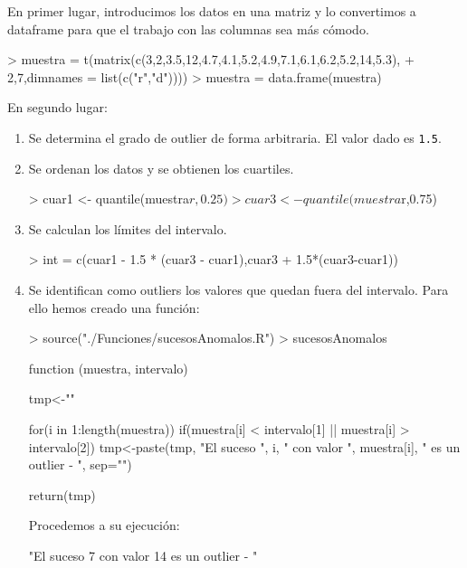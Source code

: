 \documentclass [a4paper] {article}
\begin{document}
\bigskip
En primer lugar, introducimos los datos en una matriz y lo convertimos a dataframe para que el trabajo con las 
columnas sea más cómodo.
\begin{Schunk}
\begin{Sinput}
> muestra = t(matrix(c(3,2,3.5,12,4.7,4.1,5.2,4.9,7.1,6.1,6.2,5.2,14,5.3),
+         2,7,dimnames = list(c("r","d"))))
> muestra = data.frame(muestra)
\end{Sinput}
\end{Schunk}

\bigskip
En segundo lugar:
\begin{enumerate}
\item Se determina el grado de outlier de forma arbitraria. El valor dado es \texttt{1.5}.
\item Se ordenan los datos y se obtienen los cuartiles.
\begin{Schunk}
\begin{Sinput}
> cuar1 <- quantile(muestra$r,0.25)
> cuar3 <- quantile(muestra$r,0.75)
\end{Sinput}
\end{Schunk}

\item Se calculan los límites del intervalo.
\begin{Schunk}
\begin{Sinput}
> int = c(cuar1 - 1.5 * (cuar3 - cuar1),cuar3 + 1.5*(cuar3-cuar1))
\end{Sinput}
\end{Schunk}

\item Se identifican como outliers los valores que quedan fuera del intervalo. Para ello 
hemos creado una función:
\begin{Schunk}
\begin{Sinput}
> source("./Funciones/sucesosAnomalos.R")
> sucesosAnomalos
\end{Sinput}
\begin{Soutput}
function (muestra, intervalo) {
    tmp<-""

    for(i in 1:length(muestra)){
        if(muestra[i] < intervalo[1] || muestra[i] > intervalo[2]){
            tmp<-paste(tmp, "El suceso ", i, " con valor ", muestra[i],
            " es un outlier - ", sep="")
        }
    }
    
    return(tmp)
}
\end{Soutput}
\end{Schunk}

\bigskip
Procedemos a su ejecución:
\begin{Schunk}
\begin{Soutput}
[1] "El suceso 7 con valor 14 es un outlier - "
\end{Soutput}
\end{Schunk}
\end{enumerate}
\end{document}
